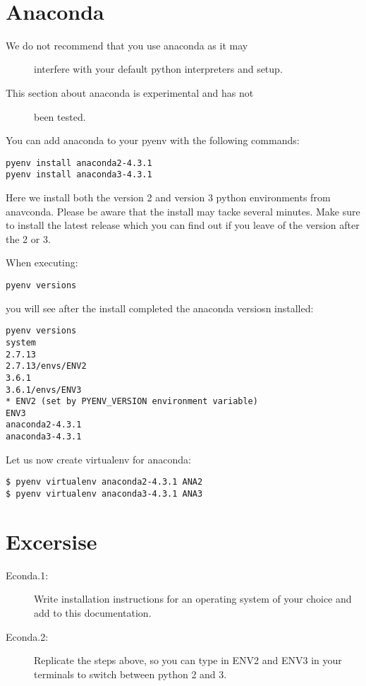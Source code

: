 \FILENAME\
\section{Anaconda}\label{anaconda}

\begin{description}
\item[We do not recommend that you use anaconda as it may]
interfere with your default python interpreters and setup.
\end{description}

\begin{description}
\item[This section about anaconda is experimental and has not]
been tested.
\end{description}

You can add anaconda to your pyenv with the following commands:

\begin{verbatim}
pyenv install anaconda2-4.3.1
pyenv install anaconda3-4.3.1
\end{verbatim}

Here we install both the version 2 and version 3 python environments
from anavconda. Please be aware that the install may tacke several
minutes. Make sure to install the latest release which you can find out
if you leave of the version after the 2 or 3.

When executing:

\begin{verbatim}
pyenv versions
\end{verbatim}

you will see after the install completed the anaconda versiosn
installed:

\begin{verbatim}
pyenv versions
system
2.7.13
2.7.13/envs/ENV2
3.6.1
3.6.1/envs/ENV3
* ENV2 (set by PYENV_VERSION environment variable)
ENV3
anaconda2-4.3.1
anaconda3-4.3.1
\end{verbatim}

Let us now create virtualenv for anaconda:

\begin{verbatim}
$ pyenv virtualenv anaconda2-4.3.1 ANA2
$ pyenv virtualenv anaconda3-4.3.1 ANA3
\end{verbatim}

\section{Excersise}\label{excersise}

\begin{description}
\item[Econda.1:]
Write installation instructions for an operating system of your choice
and add to this documentation.
\item[Econda.2:]
Replicate the steps above, so you can type in ENV2 and ENV3 in your
terminals to switch between python 2 and 3.
\end{description}
